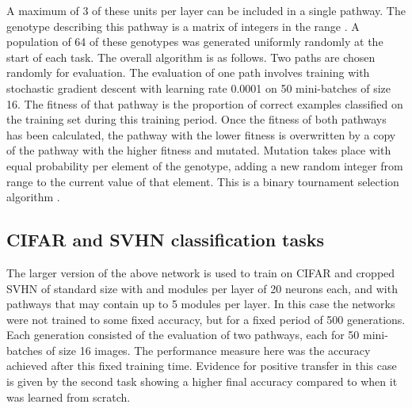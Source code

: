 \documentclass{sig-alternate-05-2015}
\begin{document}
A maximum of 3 of these units per layer can be included in a single pathway. The genotype describing this pathway is a  matrix of integers in the range . A population of 64 of these genotypes was generated uniformly randomly at the start of each task. The overall algorithm is as follows. Two paths are chosen randomly for evaluation. The evaluation of one path involves training with stochastic gradient descent with learning rate 0.0001 on 50 mini-batches of size 16. The fitness of that pathway is the proportion of correct examples classified on the training set during this training period. Once the fitness of both pathways has been calculated, the pathway with the lower fitness is overwritten by a copy of the pathway with the higher fitness and mutated. Mutation takes place with equal probability  per element of the genotype, adding a new random integer from range to the current value of that element. This is a binary tournament selection algorithm  \cite{harvey2011microbial}.\\ 

\subsection{CIFAR and SVHN classification tasks} 
The larger version of the above network is used to train on CIFAR and cropped SVHN \cite{netzer2011reading} of standard size  with and  modules per layer of 20 neurons each, and with pathways that may contain up to 5 modules per layer. In this case the networks were not trained to some fixed accuracy, but for a fixed period of 500 generations. Each generation consisted of the evaluation of two pathways, each for 50 mini-batches of size 16 images. The performance measure here was the accuracy achieved after this fixed training time. Evidence for positive transfer in this case is given by the second task showing a higher final accuracy compared to when it was learned from scratch.\\
\end{document}

